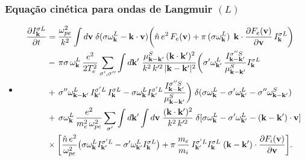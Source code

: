 \documentclass[10pt,aspectratio=1610,lualatex]{beamer}
\begin{document}
\begin{frame}
  \frametitle{Equação cinética para ondas de Langmuir $(L)$}
  \begin{itemize}
    \item
    \begin{equation}
  \label{L}
  \begin{split}
\frac{\partial I_{\bf k}^{\sigma L}}{\partial t}
&=\frac{\omega_{pe}^2}{k^2}\int d{\bf v}\;
\delta(\sigma\omega_{\bf k}^L-{\bf k}\cdot{\bf v})
\biggl(\hat{n}\,e^2\,F_e({\bf v})+\pi\,(\sigma\omega_{\bf k}^L)\,
\;{\bf k}\cdot\frac{\partial F_e({\bf v})}{\partial{\bf v}}
\,I_{\bf k}^{\sigma L}\biggr)\\
&-\,\pi\sigma\,\omega_{\bf k}^L
\,\frac{e^2}{2T_e^2}\sum_{\sigma ',\sigma ''}\int d{\bf k'}\;
\frac{\mu_{{\bf k}-{\bf k}'}^S
\,({\bf k}\cdot{\bf k}')^2}{k^2\,k'^2\,|{\bf k}-{\bf k}'|^2}
\biggl(\sigma '\omega_{{\bf k}'}^L\,
\frac{I_{{\bf k}-{\bf k}'}^{\sigma ''S}}{\mu_{{\bf k}-{\bf k}'}^S}
I_{\bf k}^{\sigma L}\\
&+\,\sigma ''\omega_{{\bf k}-{\bf k}'}^L
\,I_{{\bf k}'}^{\sigma 'L}\,I_{\bf k}^{\sigma L}
-\sigma\omega_{\bf k}^L I_{{\bf k}'}^{\sigma 'L}
\frac{I_{{\bf k}-{\bf k}'}^{\sigma ''S}}
{\mu_{{\bf k}-{\bf k}'}^S}\biggr)
\;\delta(\sigma\omega_{\bf k}^L-\sigma '\omega_{{\bf k}'}^L
-\sigma ''\omega_{{\bf k}-{\bf k}'}^S)\\
&+\,\sigma\omega_{\bf k}^L\,\frac{e^2}{m_e^2\,\omega_{pe}^2}
\sum_{\sigma '}\int d{\bf k'}\int d{\bf v}\;
\frac{({\bf k}\cdot{\bf k}')^2}{k^2\,k'^2}\;\delta[\sigma\omega_{\bf k}^L
-\sigma '\omega_{{\bf k}'}^L-({\bf k}-{\bf k}')\cdot{\bf v}]\\
&\times\biggl[\frac{\hat{n}\,e^2}{\omega_{pe}^2}
\bigl(\sigma\omega_{\bf k}^LI_{{\bf k}'}^{\sigma 'L}
  -\sigma '\omega_{{\bf k}'}^L I_{\bf k}^{\sigma L}\bigr)
+\pi\,\frac{m_e}{m_i}\,I_{{\bf k}'}^{\sigma 'L}
I_{\bf k}^{\sigma L}\;({\bf k}-{\bf k}')
\cdot\frac{\partial F_i({\bf v})}{\partial{\bf v}}\biggr].
  \end{split}
\end{equation}
  \end{itemize}
\end{frame}
\end{document}
